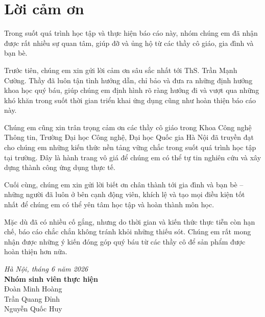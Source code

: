\chapter*{Lời cảm ơn}

Trong suốt quá trình học tập và thực hiện báo cáo này, nhóm chúng em đã nhận được rất nhiều sự quan tâm, giúp đỡ và ủng hộ từ các thầy cô giáo, gia đình và bạn bè.

Trước tiên, chúng em xin gửi lời cảm ơn sâu sắc nhất tới ThS. Trần Mạnh Cường. Thầy đã luôn tận tình hướng dẫn, chỉ bảo và đưa ra những định hướng khoa học quý báu, giúp chúng em định hình rõ ràng hướng đi và vượt qua những khó khăn trong suốt thời gian triển khai ứng dụng cũng như hoàn thiện báo cáo này.

Chúng em cũng xin trân trọng cảm ơn các thầy cô giáo trong Khoa Công nghệ Thông tin, Trường Đại học Công nghệ, Đại học Quốc gia Hà Nội đã truyền đạt cho chúng em những kiến thức nền tảng vững chắc trong suốt quá trình học tập tại trường. Đây là hành trang vô giá để chúng em có thể tự tin nghiên cứu và xây dựng thành công ứng dụng thực tế.

Cuối cùng, chúng em xin gửi lời biết ơn chân thành tới gia đình và bạn bè – những người đã luôn ở bên cạnh động viên, khích lệ và tạo mọi điều kiện tốt nhất để chúng em có thể yên tâm học tập và hoàn thành môn học.

Mặc dù đã có nhiều cố gắng, nhưng do thời gian và kiến thức thực tiễn còn hạn chế, báo cáo chắc chắn không tránh khỏi những thiếu sót. Chúng em rất mong nhận được những ý kiến đóng góp quý báu từ các thầy cô để sản phẩm được hoàn thiện hơn nữa.

\begin{flushright}
\textit{Hà Nội, tháng 6 năm 2026}\\
\textbf{Nhóm sinh viên thực hiện}\\
Đoàn Minh Hoàng\\
Trần Quang Đỉnh\\
Nguyễn Quốc Huy
\end{flushright}
